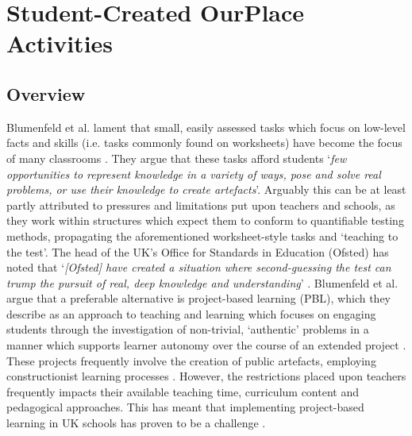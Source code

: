 \chapter{Student-Created OurPlace Activities}
\label{chap:student-created}


\section{Overview}
Blumenfeld et al. lament that small, easily assessed tasks which focus on low-level facts and skills (i.e. tasks commonly found on worksheets) have become the focus of many classrooms \cite{Blumenfeld1991}. They argue that these tasks afford students `\textit{few opportunities to represent knowledge in a variety of ways, pose and solve real problems, or use their knowledge to create artefacts}'. Arguably this can be at least partly attributed to pressures and limitations put upon teachers and schools, as they work within structures which expect them to conform to quantifiable testing methods, propagating the aforementioned worksheet-style tasks and `teaching to the test'. The head of the UK's Office for Standards in Education (Ofsted) has noted that `\textit{[Ofsted] have created a situation where second-guessing the test can trump the pursuit of real, deep knowledge and understanding}' \cite{Ofsted2018}. Blumenfeld et al. argue that a preferable alternative is project-based learning (PBL), which they describe as an approach to teaching and learning which focuses on engaging students through the investigation of non-trivial, `authentic' problems in a manner which supports learner autonomy over the course of an extended project \cite{Blumenfeld1991}. These projects frequently involve the creation of public artefacts, employing constructionist learning processes \cite{PapertSeymourandHarel1991a, Holubova2008}. However, the restrictions placed upon teachers frequently impacts their available teaching time, curriculum content and pedagogical approaches. This has meant that implementing project-based learning in UK schools has proven to be a challenge \cite{TheEducationEndowmentFoundation2016}.

